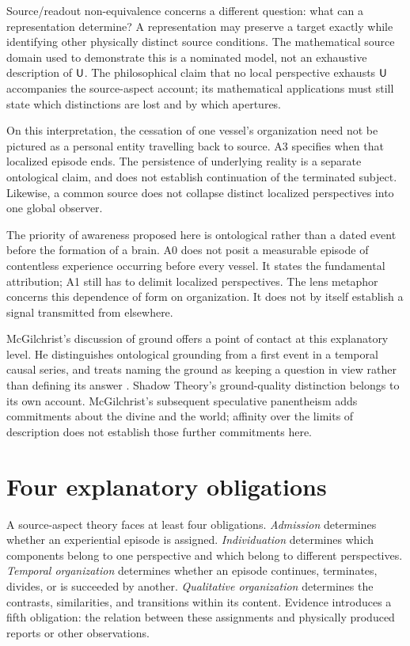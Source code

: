 Source/readout non-equivalence concerns a different question: what can a representation determine? A representation may preserve a target exactly while identifying other physically distinct source conditions. The mathematical source domain used to demonstrate this is a nominated model, not an exhaustive description of $\mathsf{U}$. The philosophical claim that no local perspective exhausts $\mathsf{U}$ accompanies the source-aspect account; its mathematical applications must still state which distinctions are lost and by which apertures.

On this interpretation, the cessation of one vessel's organization need not be pictured as a personal entity travelling back to source. A3 specifies when that localized episode ends. The persistence of underlying reality is a separate ontological claim, and does not establish continuation of the terminated subject. Likewise, a common source does not collapse distinct localized perspectives into one global observer.

The priority of awareness proposed here is ontological rather than a dated event before the formation of a brain. A0 does not posit a measurable episode of contentless experience occurring before every vessel. It states the fundamental attribution; A1 still has to delimit localized perspectives. The lens metaphor concerns this dependence of form on organization. It does not by itself establish a signal transmitted from elsewhere.

McGilchrist's discussion of ground offers a point of contact at this explanatory level. He distinguishes ontological grounding from a first event in a temporal causal series, and treats naming the ground as keeping a question in view rather than defining its answer \cite[vol.~2, ch.~28, opening discussion and ``Talking about the ground of Being'']{McGilchristMatter2021}. Shadow Theory's ground-quality distinction belongs to its own account. McGilchrist's subsequent speculative panentheism adds commitments about the divine and the world; affinity over the limits of description does not establish those further commitments here.

\section{Four explanatory obligations}\label{section:problem:four-explanatory-obligations}
A source-aspect theory faces at least four obligations. \emph{Admission} determines whether an experiential episode is assigned. \emph{Individuation} determines which components belong to one perspective and which belong to different perspectives. \emph{Temporal organization} determines whether an episode continues, terminates, divides, or is succeeded by another. \emph{Qualitative organization} determines the contrasts, similarities, and transitions within its content. Evidence introduces a fifth obligation: the relation between these assignments and physically produced reports or other observations.

